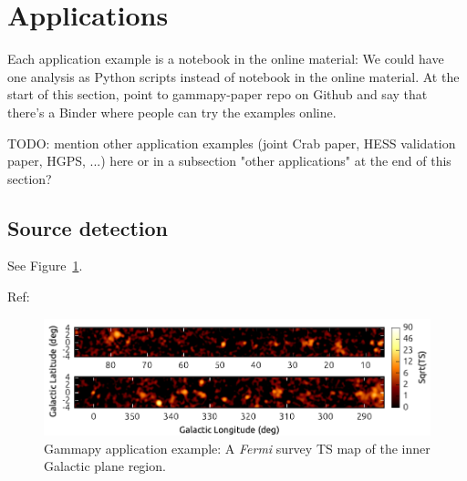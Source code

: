 \section{Applications}
\label{sec:apps}

Each application example is a notebook in the online material: We could have one
analysis as Python scripts instead of notebook in the online material. At the
start of this section, point to gammapy-paper repo on Github and say that
there’s a Binder where people can try the examples online.

TODO: mention other application examples (joint Crab paper, HESS validation
paper, HGPS, ...) here or in a subsection "other applications" at the end of
this section?

\subsection{Source detection}
\label{apps:detect}

See Figure~\ref{fig:fermi-ts-image}.

Ref: \citep{Stewart2009}

\begin{figure}[t]
\centering
\includegraphics[width=1.\textwidth]{figures/gammapy-fermi-ts-image}
\caption{
Gammapy application example: A \textit{Fermi} survey TS map of the inner
Galactic plane region.
}
\label{fig:fermi-ts-image}
\end{figure}

